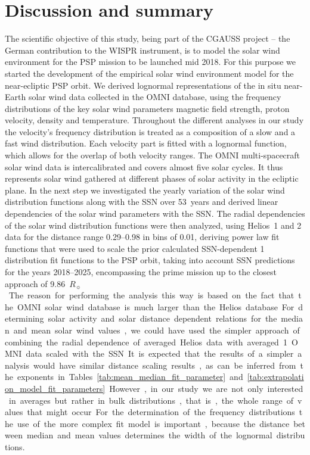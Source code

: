 \documentclass[]{aa}
\newcommand{\Rs}{$R_\sun{}$}
\begin{document}
	\section{Discussion and summary}
	\label{sec:discussion_and_summary}
	The scientific objective of this study, being part of the CGAUSS project -- the German contribution to the WISPR instrument, is to model the solar wind environment for the PSP mission to be launched mid 2018. For this purpose we started the development of the empirical solar wind environment model for the near-ecliptic PSP orbit. We derived lognormal representations of the in situ near-Earth solar wind data collected in the OMNI database, using the frequency distributions of the key solar wind parameters magnetic field strength, proton velocity, density and temperature. Throughout the different analyses in our study the velocity's frequency distribution is treated as a composition of a slow and a fast wind distribution. Each velocity part is fitted with a lognormal function, which allows for the overlap of both velocity ranges. The OMNI multi-spacecraft solar wind data is intercalibrated and covers almost five solar cycles. It thus represents solar wind gathered at different phases of solar activity in the ecliptic plane. In the next step we investigated the yearly variation of the solar wind distribution functions along with the SSN over 53~years and derived linear dependencies of the solar wind parameters with the SSN. The radial dependencies of the solar wind distribution functions were then analyzed, using Helios~1 and 2 data for the distance range \SIrange{0.29}{0.98}{\au} in bins of \SI{0.01}{\au}, deriving power law fit functions that were used to scale the prior calculated SSN-dependent \SI{1}{\au} distribution fit functions to the PSP orbit, taking into account SSN predictions for the years 2018--2025, encompassing the prime mission up to the closest approach of \SI{9.86}{\Rs}. The reason for performing the analysis this way is based on the fact that the OMNI solar wind database is much larger than the Helios database.

	For determining solar activity and solar distance dependent relations for the median and mean solar wind values, we could have used the simpler approach of combining the radial dependence of averaged Helios data with averaged \SI{1}{\au} OMNI data scaled with the SSN. It is expected that the results of a simpler analysis would have similar distance scaling results, as can be inferred from the exponents in Tables~\ref{tab:mean_median_fit_parameter} and \ref{tab:extrapolation_model_fit_parameters}. However, in our study we are not only interested in averages but rather in bulk distributions, that is, the whole range of values that might occur. For the determination of the frequency distributions the use of the more complex fit model is important, because the distance between median and mean values determines the width of the lognormal distributions.
\end{document}
